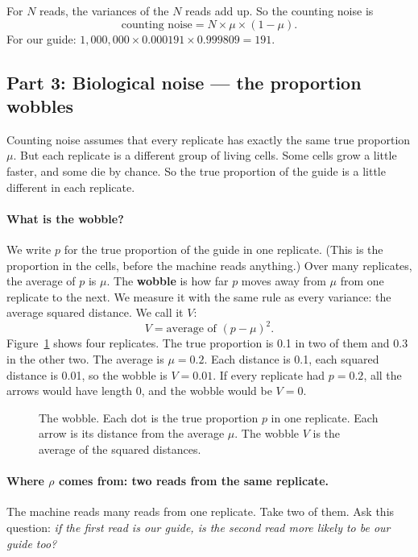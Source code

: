 For $N$ reads, the variances of the $N$ reads add up. So the counting noise
is
\[
\text{counting noise} = N \times \mu \times (1-\mu).
\]
For our guide: $1{,}000{,}000 \times 0.000191 \times 0.999809 = 191$.

\subsection{Part 3: Biological noise --- the proportion wobbles}

Counting noise assumes that every replicate has exactly the same true
proportion $\mu$. But each replicate is a different group of living cells.
Some cells grow a little faster, and some die by chance. So the true
proportion of the guide is a little different in each replicate.

\paragraph{What is the wobble?} We write $p$ for the true proportion of the
guide in one replicate. (This is the proportion in the cells, before the
machine reads anything.) Over many replicates, the average of $p$ is $\mu$.
The \textbf{wobble} is how far $p$ moves away from $\mu$ from one replicate
to the next. We measure it with the same rule as every variance: the average
squared distance. We call it $V$:
\[
V = \text{average of } (p - \mu)^2 .
\]
Figure~\ref{fig:wobble} shows four replicates. The true proportion is 0.1 in
two of them and 0.3 in the other two. The average is $\mu = 0.2$. Each
distance is 0.1, each squared distance is 0.01, so the wobble is $V = 0.01$.
If every replicate had $p = 0.2$, all the arrows would have length 0, and
the wobble would be $V = 0$.

\begin{figure}[ht]
\centering

\caption{The wobble. Each dot is the true proportion $p$ in one replicate.
Each arrow is its distance from the average $\mu$. The wobble $V$ is the
average of the squared distances.}
\label{fig:wobble}
\end{figure}

\paragraph{Where $\rho$ comes from: two reads from the same replicate.}
The machine reads many reads from one replicate. Take two of them. Ask this
question: \emph{if the first read is our guide, is the second read more
likely to be our guide too?}

